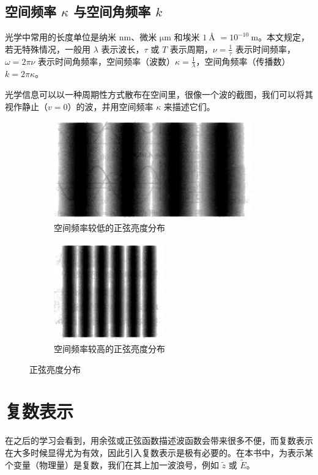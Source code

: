 \documentclass[UTF8]{report}
\theoremstyle{MyLineTheoremStyle} %
\theoremstyle{MyBlockTheoremStyle} %
\theoremstyle{MySubsubsectionStyle} %
\begin{document}
\subsection{空间频率 $\kappa$ 与空间角频率 $k$}

光学中常用的长度单位是纳米 $\mathrm{nm}$、微米 $\mathrm{\mu m}$ 和埃米 $1\ \si{\angstrom}$ $ = 10^{-10}\ \mathrm{m}$。本文规定，若无特殊情况，一般用 $\lambda$ 表示波长，$\tau $ 或 $T$ 表示周期，$\nu = \frac{1}{\tau}$ 表示时间频率，$\omega = 2\pi\nu$ 表示时间角频率，空间频率（波数）$\kappa = \frac{1}{\lambda}$，空间角频率（传播数）$k = 2\pi \kappa$。

光学信息可以以一种周期性方式散布在空间里，很像一个波的截图，我们可以将其视作静止（$v=0$）的波，并用空间频率 $\kappa$ 来描述它们。

\begin{figure}[H]\centering
\begin{subfigure}[t]{0.62\columnwidth}\centering
    \includegraphics[height=120pt]{assets/1,2/image (41).jpg}
    \caption{ 空间频率较低的正弦亮度分布 }
\end{subfigure}\begin{subfigure}[t]{0.37\columnwidth}\centering
    \includegraphics[height=120pt]{assets/1,2/image (42).jpg}
    \caption{ 空间频率较高的正弦亮度分布 }
\end{subfigure}
\caption{ 正弦亮度分布 }
\end{figure}

\section{复数表示}
在之后的学习会看到，用余弦或正弦函数描述波函数会带来很多不便，而复数表示在大多时候显得尤为有效，因此引入复数表示是极有必要的。在本书中，为表示某个变量（物理量）是复数，我们在其上加一波浪号，例如 $\tilde{z}$ 或 $\tilde{E}$。
\end{document}
